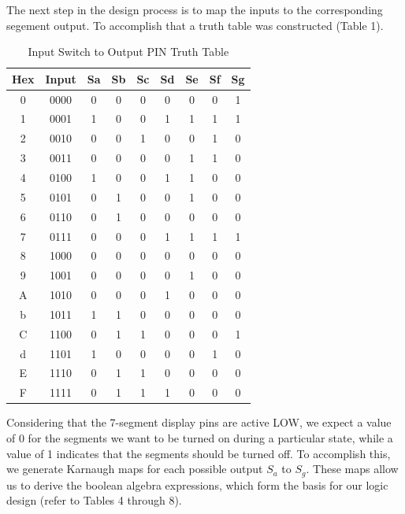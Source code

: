 \documentclass{article}
\begin{document}
The next step in the design process is to map the inputs to the corresponding segement output. To accomplish that a truth table was constructed (Table 1).

\begin{table}[H]
\centering
\begin{tabular}{|c|c|c|c|c|c|c|c|c|}
\hline
Hex & Input & Sa & Sb & Sc & Sd & Se & Sf & Sg \\
\hline
0 & 0000 & 0 & 0 & 0 & 0 & 0 & 0 & 1 \\
\hline
1 & 0001 & 1 & 0 & 0 & 1 & 1 & 1 & 1 \\
\hline
2 & 0010 & 0 & 0 & 1 & 0 & 0 & 1 & 0 \\
\hline
3 & 0011 & 0 & 0 & 0 & 0 & 1 & 1 & 0 \\
\hline
4 & 0100 & 1 & 0 & 0 & 1 & 1 & 0 & 0 \\
\hline
5 & 0101 & 0 & 1 & 0 & 0 & 1 & 0 & 0 \\
\hline
6 & 0110 & 0 & 1 & 0 & 0 & 0 & 0 & 0 \\
\hline
7 & 0111 & 0 & 0 & 0 & 1 & 1 & 1 & 1 \\
\hline
8 & 1000 & 0 & 0 & 0 & 0 & 0 & 0 & 0 \\
\hline
9 & 1001 & 0 & 0 & 0 & 0 & 1 & 0 & 0 \\
\hline
A & 1010 & 0 & 0 & 0 & 1 & 0 & 0 & 0 \\
\hline
b & 1011 & 1 & 1 & 0 & 0 & 0 & 0 & 0 \\
\hline
C & 1100 & 0 & 1 & 1 & 0 & 0 & 0 & 1 \\
\hline
d & 1101 & 1 & 0 & 0 & 0 & 0 & 1 & 0 \\
\hline
E & 1110 & 0 & 1 & 1 & 0 & 0 & 0 & 0 \\
\hline
F & 1111 & 0 & 1 & 1 & 1 & 0 & 0 & 0 \\
\hline
\end{tabular}
\caption{Input Switch to Output PIN Truth Table}
\end{table}

Considering that the 7-segment display pins are active LOW, we expect a value of 0 for the segments we want to be turned on during a particular state, while a value of 1 indicates that the segments should be turned off. To accomplish this, we generate Karnaugh maps for each possible output $S_a$ to $S_g$. These maps allow us to derive the boolean algebra expressions, which form the basis for our logic design (refer to Tables 4 through 8).
\end{document}
